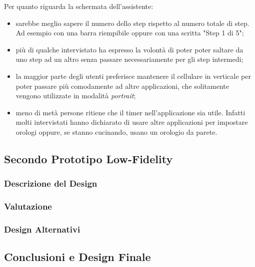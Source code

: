 Per quanto riguarda la schermata dell'assistente:
\begin{itemize}
  \item sarebbe meglio sapere il numero dello step rispetto al numero totale di step.
    Ad esempio con una barra riempibile oppure con una scritta "Step 1 di 5";

  \item più di qualche intervistato ha espresso la volontà di poter poter saltare da uno step ad un altro senza passare necessariamente per gli step intermedi;

  \item la maggior parte degli utenti preferisce mantenere il cellulare in verticale per poter passare più comodamente ad altre applicazioni, che solitamente vengono utilizzate in modalità \textit{portrait};

  \item meno di metà persone ritiene che il timer nell'applicazione sia utile.
    Infatti molti intervistati hanno dichiarato di usare altre applicazioni per impostare orologi oppure, se stanno cucinando, usano un orologio da parete.
\end{itemize}


\subsection{Secondo Prototipo Low-Fidelity}
\subsubsection{Descrizione del Design}
\subsubsection{Valutazione}











\subsubsection{Design Alternativi}

\subsection{Conclusioni e Design Finale}
